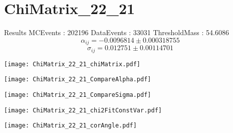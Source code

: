 \documentclass[a4paper,12pt]{article}
\begin{document}
\section{ChiMatrix\_22\_21}
\begin{minipage}{0.49\linewidth} Results \newline
MCEvents : 202196\newline
DataEvents : 33031 \newline
ThresholdMass : 54.6086\\
$$\alpha_{ij} = -0.0096814\pm 0.000318755$$
$$\sigma_{ij} = 0.012751\pm 0.00114701$$
\end{minipage}\hfill
\begin{minipage}{0.49\linewidth} 
\texttt{[image: ChiMatrix\_22\_21\_chiMatrix.pdf]}\\
\end{minipage}
\hfill
\begin{minipage}{0.49\linewidth} 
\texttt{[image: ChiMatrix\_22\_21\_CompareAlpha.pdf]}\\
\end{minipage}
\hfill
\begin{minipage}{0.49\linewidth} 
\texttt{[image: ChiMatrix\_22\_21\_CompareSigma.pdf]}\\
\end{minipage}
\begin{minipage}{0.49\linewidth} 
\texttt{[image: ChiMatrix\_22\_21\_chi2FitConstVar.pdf]}\\
\end{minipage}
\hfill
\begin{minipage}{0.49\linewidth} 
\texttt{[image: ChiMatrix\_22\_21\_corAngle.pdf]}\\
\end{minipage}
\end{document}
